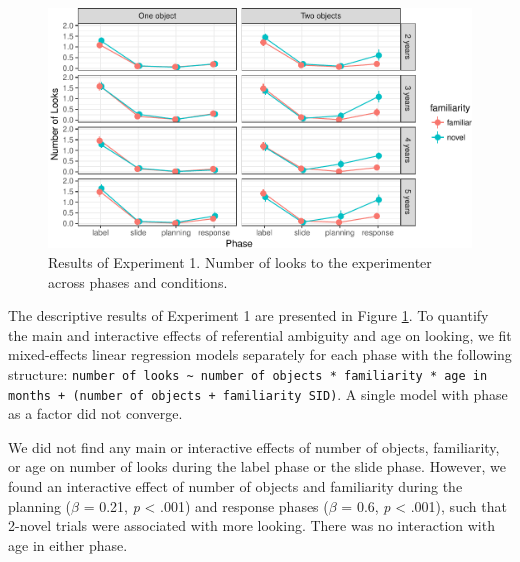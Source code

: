 \documentclass[10pt, letterpaper]{article}
\newenvironment{CodeChunk}{}{}
\begin{document}
\begin{CodeChunk}
\begin{figure}[h]

{\centering \includegraphics{figs/results_e1-1} 

}

\caption[Results of Experiment 1]{Results of Experiment 1. Number of looks to the experimenter across phases and conditions.}\label{fig:results_e1}
\end{figure}
\end{CodeChunk}

The descriptive results of Experiment 1 are presented in Figure
\ref{fig:results_e1}. To quantify the main and interactive effects of
referential ambiguity and age on looking, we fit mixed-effects linear
regression models separately for each phase with the following
structure:
\texttt{number of looks \textasciitilde{} number of objects * familiarity * age in months + (number of objects + familiarity \textbar{} SID)}.
A single model with phase as a factor did not converge.

We did not find any main or interactive effects of number of objects,
familiarity, or age on number of looks during the label phase or the
slide phase. However, we found an interactive effect of number of
objects and familiarity during the planning (\(\beta\) = 0.21, \emph{p}
\textless{} .001) and response phases (\(\beta\) = 0.6, \emph{p}
\textless{} .001), such that 2-novel trials were associated with more
looking. There was no interaction with age in either phase.
\end{document}
